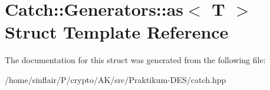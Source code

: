 \hypertarget{structCatch_1_1Generators_1_1as}{}\section{Catch\+:\+:Generators\+:\+:as$<$ T $>$ Struct Template Reference}
\label{structCatch_1_1Generators_1_1as}


The documentation for this struct was generated from the following file\+:\begin{DoxyCompactItemize}
\item 
/home/sinflair/\+P/crypto/\+A\+K/src/\+Praktikum-\/\+D\+E\+S/catch.\+hpp\end{DoxyCompactItemize}
